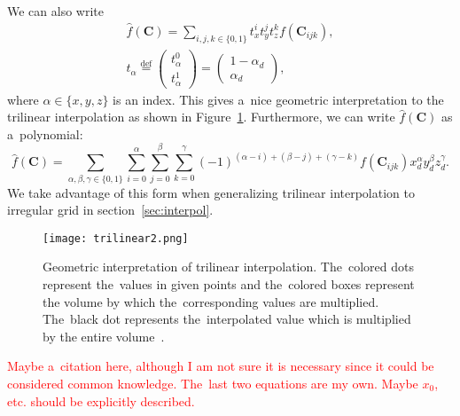 				We can also write
					\begin{eqnarray}
						\widehat{f}(\mathbf{C}) = \sum_{i,j,k \in \{0,1\}} t_x^i t_y^j t_z^k f(\mathbf{C}_{ijk}),\\
						t_\alpha \stackrel{\text{def}}{=} \begin{pmatrix}t_\alpha^0\\ t_\alpha^1\end{pmatrix} = \begin{pmatrix}1-\alpha_d\\ \alpha_d\end{pmatrix},
					\end{eqnarray}
				where $\alpha \in \{x,y,z\}$ is an index. This gives a~nice geometric interpretation to the trilinear interpolation as shown in Figure~\ref{fig:trilin2}. Furthermore, we can write $\widehat{f}(\mathbf{C})$ as a~polynomial:
					\begin{equation}
						\label{eq:trilinpoly}
						\widehat{f}(\mathbf{C}) = \sum_{\alpha,\beta,\gamma \in \{0,1\}}\sum^{\alpha}_{i=0}\sum^{\beta}_{j=0}\sum^{\gamma}_{k=0} 	(-1)^{(\alpha-i)+(\beta-j)+(\gamma-k)} f(\mathbf{C}_{ijk}) x_d^\alpha y_d^\beta z_d^\gamma.
					\end{equation}
				We take advantage of this form when generalizing trilinear interpolation to irregular grid in section~\ref{sec:interpol}.
					
				\begin{figure}
					\centering
					\texttt{[image: trilinear2.png]}
					\caption{Geometric interpretation of trilinear interpolation. The~colored dots represent the~values in given points and the~colored boxes represent the volume by which the~corresponding values are multiplied. The~black dot represents the~interpolated value which is multiplied by the entire volume~\cite{trilinear}.}
					\label{fig:trilin2}
				\end{figure}
				
				\textcolor{red}{Maybe a~citation here, although I am not sure it is necessary since it could be considered common knowledge. The~last two equations are my own. Maybe $x_0$, etc. should be explicitly described.}